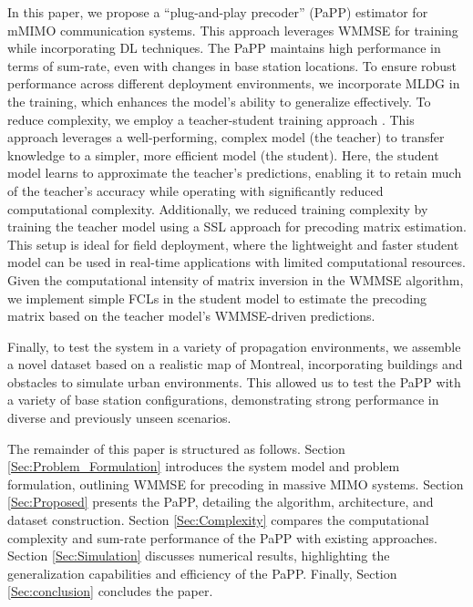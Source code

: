 In this paper, we propose a ``plug-and-play precoder'' (PaPP) estimator for \gls{mMIMO} communication systems. This approach leverages \gls{WMMSE} for training while incorporating \gls{DL} techniques. The PaPP maintains high performance in terms of sum-rate, even with changes in base station locations. To ensure robust performance across different deployment environments, we incorporate \gls{MLDG} in the training, which enhances the model's ability to generalize effectively.
To reduce complexity, we employ a teacher-student training approach \cite{hu2023teacher}. This approach leverages a well-performing, complex model (the teacher) to transfer knowledge to a simpler, more efficient model (the student). Here, the student model learns to approximate the teacher’s predictions, enabling it to retain much of the teacher’s accuracy while operating with significantly reduced computational complexity. Additionally, we reduced training complexity by training the teacher model using a \gls{SSL} approach for precoding matrix estimation. This setup is ideal for field deployment, where the lightweight and faster student model can be used in real-time applications with limited computational resources.
Given the computational intensity of matrix inversion in the WMMSE algorithm, we implement simple \glspl{FCL} in the student model to estimate the precoding matrix based on the teacher model’s WMMSE-driven predictions.

Finally, to test the system in a variety of propagation environments, we assemble a novel dataset based on a realistic map of Montreal, incorporating buildings and obstacles to simulate urban environments. This allowed us to test the PaPP with a variety of base station configurations, demonstrating strong performance in diverse and previously unseen scenarios.

The remainder of this paper is structured as follows. Section \ref{Sec:Problem_Formulation} introduces the system model and problem formulation, outlining WMMSE for precoding in massive MIMO systems. Section \ref{Sec:Proposed} presents the PaPP, detailing the algorithm, architecture, and dataset construction. Section \ref{Sec:Complexity} compares the computational complexity and sum-rate performance of the PaPP with existing approaches. Section \ref{Sec:Simulation} discusses numerical results, highlighting the generalization capabilities and efficiency of the PaPP. Finally, Section \ref{Sec:conclusion} concludes the paper.